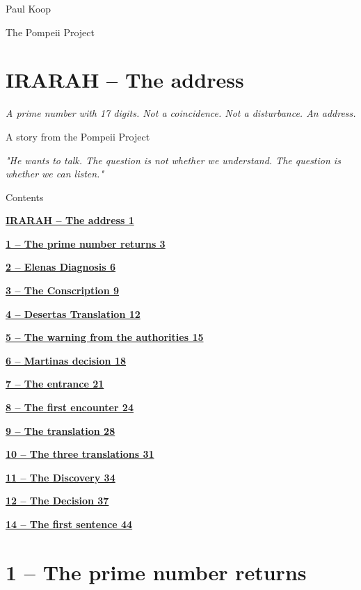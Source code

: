 \documentclass[
]{article}
\author{}
\date{}
\begin{document}
{
\setcounter{tocdepth}{3}
\tableofcontents
}
Paul Koop

The Pompeii Project

\section{IRARAH -- The address}\label{irarah-the-address}

\emph{A prime number with 17 digits. Not a coincidence. Not a disturbance. An address.}

A story from the Pompeii Project

\emph{"He wants to talk. The question is not whether we understand. The question is whether we can listen."}

Contents

\hyperref[irarah-the-address]{\textbf{IRARAH -- The address 1}}

\hyperref[the-prime-number-returns]{\textbf{1 -- The prime number returns 3}}

\hyperref[elenas-diagnosis]{\textbf{2 -- Elena\textquotesingle s Diagnosis 6}}

\hyperref[the-conscription]{\textbf{3 -- The Conscription 9}}

\hyperref[desertas-translation]{\textbf{4 -- Desertas Translation 12}}

\hyperref[the-warning-from-the-authorities]{\textbf{5 -- The warning from the authorities 15}}

\hyperref[martinas-decision]{\textbf{6 -- Martina\textquotesingle s decision 18}}

\hyperref[the-entrance]{\textbf{7 -- The entrance 21}}

\hyperref[the-first-encounter]{\textbf{8 -- The first encounter 24}}

\hyperref[the-translation]{\textbf{9 -- The translation 28}}

\hyperref[the-three-translations]{\textbf{10 -- The three translations 31}}

\hyperref[the-discovery]{\textbf{11 -- The Discovery 34}}

\hyperref[the-decision]{\textbf{12 -- The Decision 37}}

\hyperref[the-first-sentence]{\textbf{14 -- The first sentence 44}}

\section{1 -- The prime number returns}\label{the-prime-number-returns}
\end{document}
